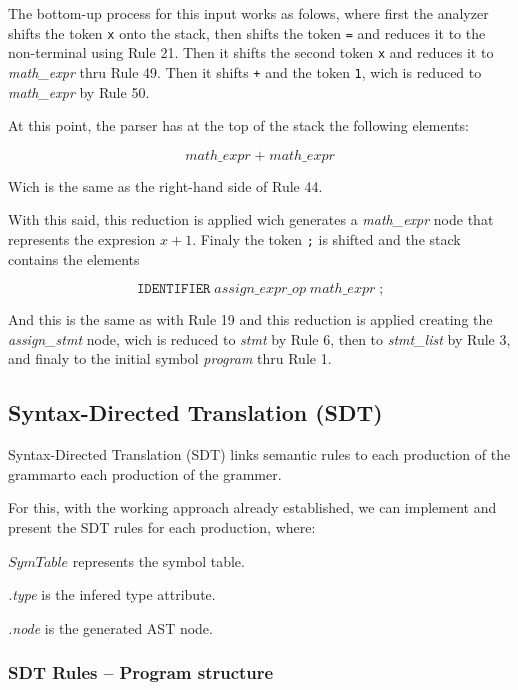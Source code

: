 \documentclass[letterpaper,12pt,oneside]{article}
\begin{document}
The bottom-up process for this input works as folows, where first the analyzer shifts the token \texttt{x} onto the stack, then shifts the token \texttt{=} and reduces it to the non-terminal using Rule 21. Then it shifts the second token \texttt{x} and reduces it to \textit{math\_expr} thru Rule 49. Then it shifts \texttt{+} and the token \texttt{1}, wich is reduced to \textit{math\_expr} by Rule 50.

At this point, the parser has at the top of the stack the following elements:

$$math\_expr \; \texttt{+} \; math\_expr$$ 

Wich is the same as the right-hand side of Rule 44.

\newpage

With this said, this reduction is applied wich generates a \textit{math\_expr} node that represents the expresion $x + 1$. Finaly the token \texttt{;} is shifted and the stack contains the elements 

$$\texttt{IDENTIFIER} \; assign\_expr\_op \; math\_expr \; \texttt{;}$$ 

And this is the same as with Rule 19 and this reduction is applied creating the \textit{assign\_stmt} node, wich is reduced to \textit{stmt} by Rule 6, then to \textit{stmt\_list} by Rule 3, and finaly to the initial symbol \textit{program} thru Rule 1.

\subsection{Syntax-Directed Translation (SDT)}

Syntax-Directed Translation (SDT) links semantic rules to each production of the grammarto each production of the grammer. 

For this, with the working approach already established, we can implement and present the SDT rules for each production, where:

$SymTable$ represents the symbol table. 

\textit{.type} is the infered type attribute.

\textit{.node} is the generated AST node.

\subsubsection{SDT Rules -- Program structure}
\end{document}
